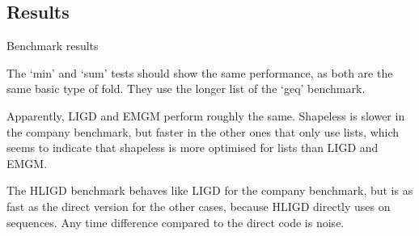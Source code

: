 \clearpage{}
\subsection{Results}
\begin{table}[t]
\centering

\caption{Benchmark results}
\label{bench}
\end{table}
The `min' and `sum' tests should show the same performance, as both are the
same basic type of fold. They use the longer list of the `geq' benchmark.

Apparently, LIGD and EMGM perform roughly the same. Shapeless is slower in the
company benchmark, but faster in the other ones that only use lists, which seems
to indicate that shapeless is more optimised for lists than LIGD and EMGM.

The HLIGD benchmark behaves like LIGD for the company benchmark, but is as fast
as the direct version for the other cases, because HLIGD directly uses
 on sequences. Any time difference compared to the direct code is
noise.
